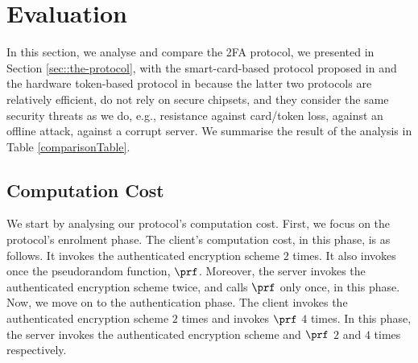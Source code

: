 
\vspace{-4mm}
\section{Evaluation}\label{sec::eval}
\vspace{-2mm}
In this section, we analyse and compare the 2FA protocol, we presented in Section \ref{sec::the-protocol}, with the smart-card-based protocol proposed in  \cite{WangW18} and the hardware token-based protocol in \cite{JareckiJKSS21} because the latter two protocols are relatively efficient, do not rely on secure chipsets, and they consider the same security threats as we do, e.g., resistance against card/token loss, against an offline attack, against a  corrupt server. We summarise the result of the analysis in Table \ref{comparisonTable}. 










\vspace{-3mm}
\subsection{Computation Cost}

We start by analysing our protocol's computation cost. First, we focus on the protocol's enrolment phase. The client's computation cost, in this phase, is as follows. It invokes the authenticated encryption scheme $2$ times. It also invokes once the pseudorandom function, $\prf$.
%
% 
  Moreover, the server invokes the authenticated encryption scheme twice, and calls $\prf$ only once, in this phase. 
%  
%
Now, we move on to the authentication phase. The client invokes the authenticated encryption scheme $2$ times and invokes $\prf$ $4$ times. 
%
%
 In this phase, the server invokes the authenticated encryption scheme and $\prf$ $2$ and $4$ times respectively. %

